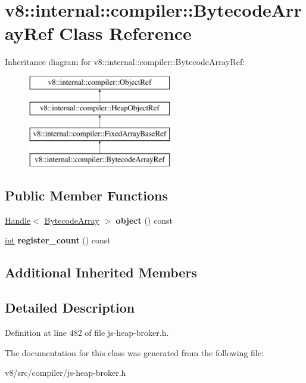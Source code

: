 \hypertarget{classv8_1_1internal_1_1compiler_1_1BytecodeArrayRef}{}\section{v8\+:\+:internal\+:\+:compiler\+:\+:Bytecode\+Array\+Ref Class Reference}
\label{classv8_1_1internal_1_1compiler_1_1BytecodeArrayRef}
Inheritance diagram for v8\+:\+:internal\+:\+:compiler\+:\+:Bytecode\+Array\+Ref\+:\begin{figure}[H]
\begin{center}
\leavevmode
\includegraphics[height=4.000000cm]{classv8_1_1internal_1_1compiler_1_1BytecodeArrayRef}
\end{center}
\end{figure}
\subsection*{Public Member Functions}
\begin{DoxyCompactItemize}
\item 
\mbox{\label{classv8_1_1internal_1_1compiler_1_1BytecodeArrayRef_a23c97a9a499d775649f922872f1ebc5a}} 
\mbox{\hyperlink{classv8_1_1internal_1_1Handle}{Handle}}$<$ \mbox{\hyperlink{classv8_1_1internal_1_1BytecodeArray}{Bytecode\+Array}} $>$ {\bfseries object} () const
\item 
\mbox{\label{classv8_1_1internal_1_1compiler_1_1BytecodeArrayRef_aa46dee91df1b9917850b86e3e771efda}} 
\mbox{\hyperlink{classint}{int}} {\bfseries register\+\_\+count} () const
\end{DoxyCompactItemize}
\subsection*{Additional Inherited Members}


\subsection{Detailed Description}


Definition at line 482 of file js-\/heap-\/broker.\+h.



The documentation for this class was generated from the following file\+:\begin{DoxyCompactItemize}
\item 
v8/src/compiler/js-\/heap-\/broker.\+h\end{DoxyCompactItemize}

